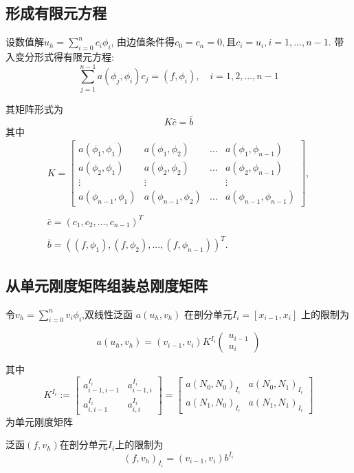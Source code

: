 \documentclass[UTF8,titlepage,twocolumn]{ctexart}
\begin{document}
\subsection{形成有限元方程}

设数值解$u_h = \sum_{i=0}^n c_i \phi_i $, 由边值条件得$c_0 = c_n = 0, \mbox{且}c_i = u_i, i=1,...,n-1$.
带入变分形式得有限元方程:
$$
\sum_{j=1}^{n-1} a(\phi_j, \phi_i) c_j = (f, \phi_i), \quad i = 1, 2, ... , n-1
$$
\par 
其矩阵形式为
$$ K \bar{c} = \bar{b} $$
其中
$$
\begin{matrix}
K = \begin{bmatrix}
		a(\phi_1,\phi_1) & a(\phi_1,\phi_2) & ... & a(\phi_1,\phi_{n-1}) \\
		a(\phi_2,\phi_1) & a(\phi_2,\phi_2) & ... & a(\phi_2,\phi_{n-1}) \\
		\vdots           & \vdots           &     & \vdots  			 \\
		a(\phi_{n-1},\phi_1) & a(\phi_{n-1},\phi_2) & ... & a(\phi_{n-1},\phi_{n-1})
	\end{bmatrix}, \\ \\
\bar{c} = (c_1, c_2, ... , c_{n-1})^T \\ \\
\bar{b} = ((f,\phi_1), (f,\phi_2), ... , (f,\phi_{n-1}))^T.
\end{matrix}
$$

\subsection{从单元刚度矩阵组装总刚度矩阵}
令$ v_h = \sum_{i=0}^{n} v_i \phi_i $,双线性泛函 $a(u_h,v_h)$ 在剖分单元$ I_i = [x_{i-1},x_i] $ 上的限制为

$$
	a(u_h,v_h) = (v_{i-1},v_i) K^{I_i} 
	\begin{pmatrix}
		u_{i-1} \\
		u_i
	\end{pmatrix}
$$

其中
$$
K^{I_i}:= \begin{bmatrix}
		  		a_{i-1,i-1}^{I_i} & a_{i-1,i}^{I_i} \\
		  		a_{i,i-1}^{I_i}   & a_{i,i}^{I_i}
		  \end{bmatrix} =
	  \begin{bmatrix}
	  	a(N_0,N_0)_{I_i} & a(N_0,N_1)_{I_i} \\
	  	a(N_1,N_0)_{I_i} & a(N_1,N_1)_{I_i}
	  \end{bmatrix}
$$
为单元刚度矩阵
\\ \par
泛函$(f,v_h)$在剖分单元$I_i$上的限制为
$$
	(f,v_h)_{I_i} = (v_{i-1},v_i) b^{I_i}
$$
\end{document}
